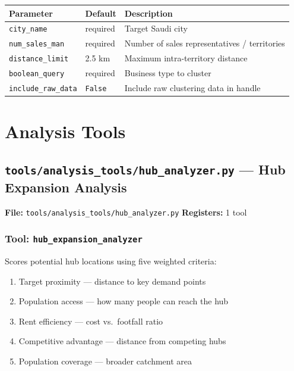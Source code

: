 \documentclass[12pt,a4paper]{report}
\begin{document}
\begin{center}
\begin{tabularx}{\linewidth}{llX}
  \toprule
  \textbf{Parameter} & \textbf{Default} & \textbf{Description} \\
  \midrule
  \texttt{city\_name} & required & Target Saudi city \\
  \texttt{num\_sales\_man} & required & Number of sales representatives / territories \\
  \texttt{distance\_limit} & 2.5 km & Maximum intra-territory distance \\
  \texttt{boolean\_query} & required & Business type to cluster \\
  \texttt{include\_raw\_data} & \texttt{False} & Include raw clustering data in handle \\
  \bottomrule
\end{tabularx}
\end{center}

\chapter{Analysis Tools}

\section{\texttt{tools/analysis\_tools/hub\_analyzer.py} --- Hub Expansion Analysis}

\begin{mdframed}[style=filebox]
\textbf{File:} \texttt{tools/analysis\_tools/hub\_analyzer.py} \quad \textbf{Registers:} 1 tool
\end{mdframed}

\subsection{Tool: \texttt{hub\_expansion\_analyzer}}

Scores potential hub locations using five weighted criteria:

\begin{enumerate}[noitemsep]
  \item Target proximity --- distance to key demand points
  \item Population access --- how many people can reach the hub
  \item Rent efficiency --- cost vs.\ footfall ratio
  \item Competitive advantage --- distance from competing hubs
  \item Population coverage --- broader catchment area
\end{enumerate}
\end{document}
